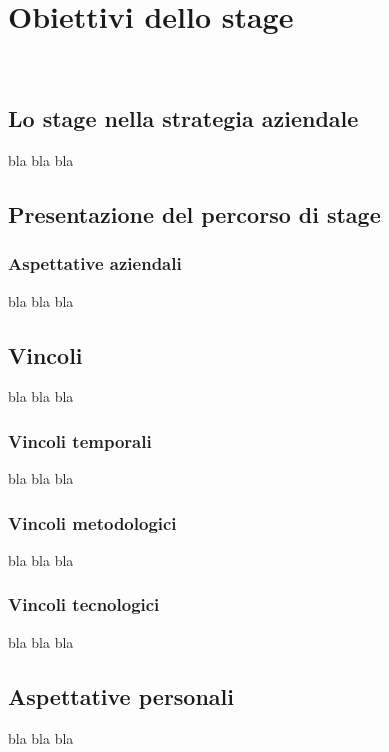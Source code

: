 
\chapter{Obiettivi dello stage}
\label{cap:obiettivi-stage}

\\

\section{Lo stage nella strategia aziendale}
bla bla bla

\section{Presentazione del percorso di stage}
\subsection{Aspettative aziendali}
bla bla bla

\section{Vincoli}
bla bla bla
\subsection{Vincoli temporali}
bla bla bla
\subsection{Vincoli metodologici}
bla bla bla
\subsection{Vincoli tecnologici}
bla bla bla

\section{Aspettative personali}
bla bla bla